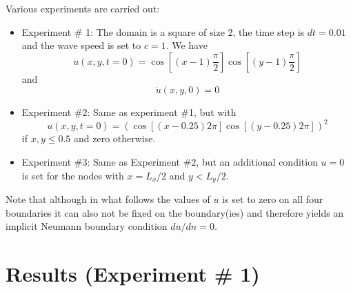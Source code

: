 Various experiments are carried out:
\begin{itemize}
\item Experiment \# 1:
The domain is a square of size 2, the time step is $dt=0.01$
and the wave speed is set to $c=1$. We have
\[
u(x,y,t=0)=\cos\left[ (x-1)\frac{\pi}{2}\right] \cos\left[ (y-1)\frac{\pi}{2} \right]
\]
and 
\[
\dot{u}(x,y,0)=0
\]
\item Experiment \#2:
Same as experiment \#1, but with
\[
u(x,y,t=0)=\left( \cos\left[ (x-0.25) 2\pi\right] \cos\left[ (y-0.25)2 \pi \right] \right)^2
\]
if $x,y \le 0.5$ and zero otherwise.

\item Experiment \#3:
Same as Experiment \#2, but an additional condition $u=0$ is set for the nodes with $x=L_x/2$
and $y<L_y/2$.

\end{itemize}

Note that although in what follows the values of $u$ is set to zero 
on all four boundaries it can also not be fixed on the boundary(ies)
and therefore yields an implicit Neumann boundary condition $du/dn=0$.

\section*{Results (Experiment \# 1)}

